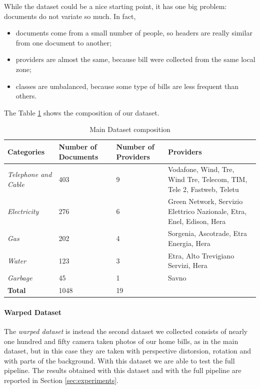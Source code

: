 \documentclass[10pt,twocolumn,letterpaper]{article}
\begin{document}
While the dataset could be a nice starting point, it has one big
problem: documents do not variate so much. In fact,
\begin{itemize}
  \item documents come from a small number of people, so headers are
    really similar from one document to another;
  \item providers are almost the same, because bill were collected
    from the same local zone;
  \item classes are umbalanced, because some type of bills are less
    frequent than others.
\end{itemize}

The Table \ref{table:main-dataset} shows the composition of our
dataset.

\bgroup
\def\arraystretch{1.3}%
\begin{table}[!h]
  \begin{center}
    \begin{tabular}{|p{1.5cm}|p{1.5cm}|p{1.5cm}|p{3cm}|}
      \hline
      Categories  & Number of Documents & Number of Providers & Providers \\ \hline
      \emph{Telephone and Cable} & 403 & 9 & Vodafone, Wind, Tre, Wind Tre, Telecom, TIM, Tele 2, Fastweb, Teletu \\
      \emph{Electricity} & 276 & 6 & Green Network, Servizio Elettrico Nazionale, Etra, Enel, Edison, Hera \\
      \emph{Gas} & 202 & 4 & Sorgenia, Ascotrade, Etra Energia, Hera \\
      \emph{Water} & 123 & 3 & Etra, Alto Trevigiano Servizi, Hera \\
      \emph{Garbage} & 45 & 1 & Savno \\ \hline
      \textbf{Total} & 1048 & 19 &  \\ \hline
    \end{tabular}
  \end{center}
  \label{table:main-dataset}
  \caption{Main Dataset composition}
\end{table}
\egroup

\paragraph{Warped Dataset}
\label{par:warped-dataset}

The \emph{warped dataset} is instead the second dataset we collected
consists of nearly one hundred and fifty camera taken photos of our
home bills, as in the main dataset, but in this case they are taken
with perspective distorsion, rotation and with parts of the
background. With this dataset we are able to test the full
pipeline. The results obtained with this dataset and with the full
pipeline are reported in Section \ref{sec:experiments}. \\
\end{document}
